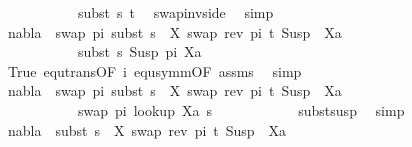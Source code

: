 \begin{isabellebody}
\ \ \ \ \ \ \ \ \ \ {\isasymapprox}\ subst\ s\ t{\isachardoublequoteclose}\ \isamarkupfalse%
\ swap{\isacharunderscore}{\kern0pt}inv{\isacharunderscore}{\kern0pt}side\ \isamarkupfalse%
\ simp\isanewline
\ \ \ \ \ \ \ \ \isamarkupfalse%
\ {\isachardoublequoteopen}nabla\ {\isasymturnstile}\ swap\ pi\ {\isacharparenleft}{\kern0pt}subst\ {\isacharparenleft}{\kern0pt}s\ {\isasymbullet}\ {\isacharbrackleft}{\kern0pt}{\isacharparenleft}{\kern0pt}X{\isacharcomma}{\kern0pt}\ swap\ {\isacharparenleft}{\kern0pt}rev\ pi{\isacharparenright}{\kern0pt}\ t{\isacharparenright}{\kern0pt}{\isacharbrackright}{\kern0pt}{\isacharparenright}{\kern0pt}\ {\isacharparenleft}{\kern0pt}Susp\ {\isacharbrackleft}{\kern0pt}{\isacharbrackright}{\kern0pt}\ Xa{\isacharparenright}{\kern0pt}{\isacharparenright}{\kern0pt}\isanewline
\ \ \ \ \ \ \ \ \ \ {\isasymapprox}\ subst\ s\ {\isacharparenleft}{\kern0pt}Susp\ pi\ Xa{\isacharparenright}{\kern0pt}{\isachardoublequoteclose}\isanewline
\ \ \ \ \ \ \ \ \ \ \isamarkupfalse%
\ True\ equ{\isacharunderscore}{\kern0pt}trans{\isacharbrackleft}{\kern0pt}OF\ i\ equ{\isacharunderscore}{\kern0pt}symm{\isacharbrackleft}{\kern0pt}OF\ assms{\isacharparenleft}{\kern0pt}{}{\isacharparenright}{\kern0pt}{\isacharbrackright}{\kern0pt}{\isacharbrackright}{\kern0pt}\ \isamarkupfalse%
\ simp\isanewline
\ \ \ \ \ \ \ \ \isamarkupfalse%
\ {\isachardoublequoteopen}nabla\ {\isasymturnstile}\ swap\ pi\ {\isacharparenleft}{\kern0pt}subst\ {\isacharparenleft}{\kern0pt}s\ {\isasymbullet}\ {\isacharbrackleft}{\kern0pt}{\isacharparenleft}{\kern0pt}X{\isacharcomma}{\kern0pt}\ swap\ {\isacharparenleft}{\kern0pt}rev\ pi{\isacharparenright}{\kern0pt}\ t{\isacharparenright}{\kern0pt}{\isacharbrackright}{\kern0pt}{\isacharparenright}{\kern0pt}\ {\isacharparenleft}{\kern0pt}Susp\ {\isacharbrackleft}{\kern0pt}{\isacharbrackright}{\kern0pt}\ Xa{\isacharparenright}{\kern0pt}{\isacharparenright}{\kern0pt}\isanewline
\ \ \ \ \ \ \ \ \ \ {\isasymapprox}\ swap\ pi\ {\isacharparenleft}{\kern0pt}look{\isacharunderscore}{\kern0pt}up\ Xa\ s{\isacharparenright}{\kern0pt}{\isachardoublequoteclose}\isanewline
\ \ \ \ \ \ \ \ \ \ \isamarkupfalse%
\ subst{\isacharunderscore}{\kern0pt}susp\ \isamarkupfalse%
\ simp\isanewline
\ \ \ \ \ \ \ \ \isamarkupfalse%
\ \isamarkupfalse%
\ {\isachardoublequoteopen}nabla\ {\isasymturnstile}\ {\isacharparenleft}{\kern0pt}subst\ {\isacharparenleft}{\kern0pt}s\ {\isasymbullet}\ {\isacharbrackleft}{\kern0pt}{\isacharparenleft}{\kern0pt}X{\isacharcomma}{\kern0pt}\ swap\ {\isacharparenleft}{\kern0pt}rev\ pi{\isacharparenright}{\kern0pt}\ t{\isacharparenright}{\kern0pt}{\isacharbrackright}{\kern0pt}{\isacharparenright}{\kern0pt}\ {\isacharparenleft}{\kern0pt}Susp\ {\isacharbrackleft}{\kern0pt}{\isacharbrackright}{\kern0pt}\ Xa{\isacharparenright}{\kern0pt}{\isacharparenright}{\kern0pt}\isanewline

\end{isabellebody}
